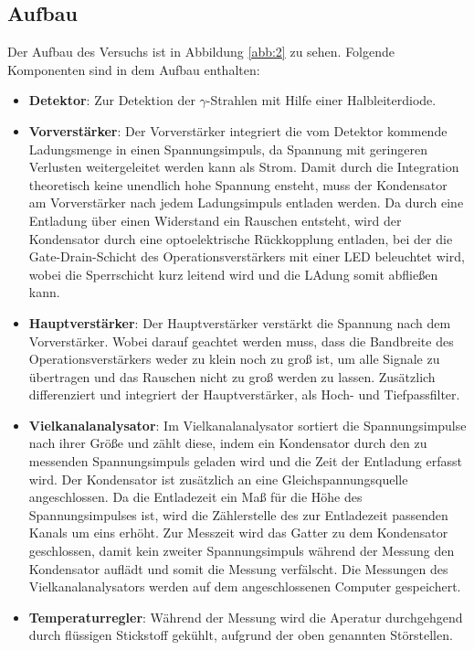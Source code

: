 \subsection{Aufbau}

Der Aufbau des Versuchs ist in Abbildung \ref{abb:2} zu sehen. Folgende
Komponenten sind in dem Aufbau enthalten:
\begin{itemize}
  \item \textbf{Detektor}: Zur Detektion der $\gamma$-Strahlen mit Hilfe
  einer Halbleiterdiode.
  \item \textbf{Vorverstärker}: Der Vorverstärker integriert die vom Detektor
  kommende Ladungsmenge in einen Spannungsimpuls, da Spannung mit geringeren
  Verlusten weitergeleitet werden kann als Strom. Damit durch die Integration
  theoretisch keine unendlich hohe Spannung ensteht, muss der Kondensator am
  Vorverstärker nach jedem Ladungsimpuls entladen werden. Da durch eine
  Entladung über einen Widerstand ein Rauschen entsteht, wird der Kondensator
  durch eine optoelektrische Rückkopplung entladen, bei der die Gate-Drain-Schicht
  des Operationsverstärkers mit einer LED beleuchtet wird, wobei die
  Sperrschicht kurz leitend wird und die LAdung somit abfließen kann.
  \item \textbf{Hauptverstärker}: Der Hauptverstärker verstärkt die Spannung
  nach dem Vorverstärker. Wobei darauf geachtet werden muss, dass die Bandbreite
  des Operationsverstärkers weder zu klein noch zu groß ist, um alle Signale zu
  übertragen und das Rauschen nicht zu groß werden zu lassen.
  Zusätzlich differenziert und integriert der Hauptverstärker, als Hoch- und
  Tiefpassfilter.
  \item \textbf{Vielkanalanalysator}: Im Vielkanalanalysator sortiert
  die Spannungsimpulse nach ihrer Größe und zählt diese, indem ein Kondensator
  durch den zu messenden Spannungsimpuls geladen wird und die Zeit der
  Entladung erfasst wird. Der Kondensator ist zusätzlich an eine
  Gleichspannungsquelle angeschlossen. Da die Entladezeit ein Maß für die
  Höhe des Spannungsimpulses ist, wird die Zählerstelle des zur Entladezeit
  passenden Kanals um eins erhöht. Zur Messzeit wird das Gatter zu dem Kondensator
  geschlossen, damit kein zweiter Spannungsimpuls während der Messung
  den Kondensator auflädt und somit die Messung verfälscht.
  Die Messungen des Vielkanalanalysators werden auf dem angeschlossenen
  Computer gespeichert.
  \item \textbf{Temperaturregler}: Während der Messung wird die Aperatur
  durchgehgend durch flüssigen Stickstoff gekühlt, aufgrund der oben genannten
  Störstellen.
\end{itemize}

